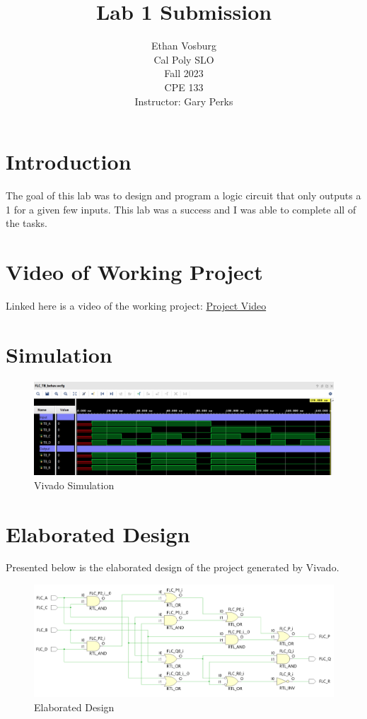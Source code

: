 \documentclass[12pt]{article}
\title{Lab 1 Submission}
\author{Ethan Vosburg\\
    Cal Poly SLO \\
    Fall 2023\\
    CPE 133\\
    Instructor: Gary Perks
}
\begin{document}
\maketitle

\newpage

\section{Introduction}

The goal of this lab was to design and program a logic circuit that only outputs a 1 for a given few inputs. This lab was a success and I was able to complete all of the tasks.

\section{Video of Working Project}

Linked here is a video of the working project: \href{https://youtu.be/21Y9dcLn3cA}{Project Video}

\section{Simulation}

\begin{figure}[h]
    \centering
    \includegraphics[width=1\textwidth]{Figures/CPE 133 Lab 1 Simulation.png}
    \caption{Vivado Simulation}
    \label{fig:simulation}
\end{figure}

\section{Elaborated Design}

Presented below is the elaborated design of the project generated by Vivado.

\begin{figure}[h]
    \centering
    \includegraphics[width=.8\textwidth]{Figures/CPE 133 Lab 1 Elaborated Design.png}
    \caption{Elaborated Design}
    \label{fig:elaborateddesign}
\end{figure}
\end{document}

